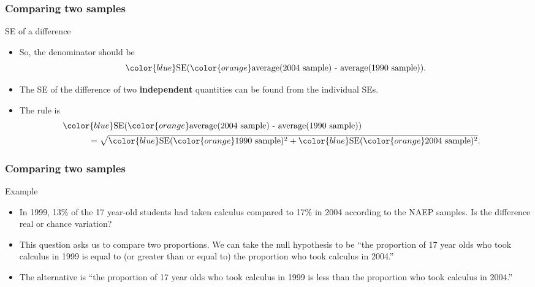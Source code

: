 \documentclass[handout]{beamer}
\begin{document}
   \begin{frame} \frametitle{Comparing two samples}

   \begin{block}
   {SE of a difference}
   \begin{itemize}

   \item So, the denominator should be
   $$
   {\color{blue} \text{SE}}({\color{orange} \text{average(2004 sample) -
   average(1990 sample)}}).
   $$

   \item The SE of the difference of two {\bf independent}
   quantities can be found from the individual SEs.

   \item The rule is
   $$
   \begin{aligned}
   \lefteqn{{\color{blue} \text{SE}}({\color{orange}
   \text{average(2004 sample) -
   average(1990 sample)}})} \\
   & \qquad \quad = \sqrt{{\color{blue}\text{SE}}({\color{orange} \text{1990 sample}})^2 + {\color{blue}\text{SE}}({\color{orange} \text{2004 sample}})^2}.
   \end{aligned}
   $$

   \end{itemize}
   \end{block}
   \end{frame}


   \begin{frame} \frametitle{Comparing two samples}

   \begin{block}
   {Example}
   \begin{itemize}
   \item In 1999, 13\% of the 17 year-old students had taken calculus
   compared to 17\% in 2004 according to the NAEP samples.
   Is the difference real or chance variation?

   \item This question asks us to compare two proportions. We can take
   the null hypothesis to be ``the proportion of 17 year olds who took
   calculus in 1999 is equal to (or greater than or equal to) the
   proportion who took calculus in 2004.''

   \item The alternative is ``the proportion of 17 year olds
   who took calculus in 1999 is less than the proportion who took calculus
   in 2004.''
   \end{itemize}
   \end{block}
   \end{frame}
\end{document}
